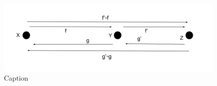 \documentclass{article}
\begin{document}
\begin{figure}
    \centering
    \includegraphics{functions.png}
    \caption{Caption}
    \label{fig:my_label}
\end{figure}
\end{document}
